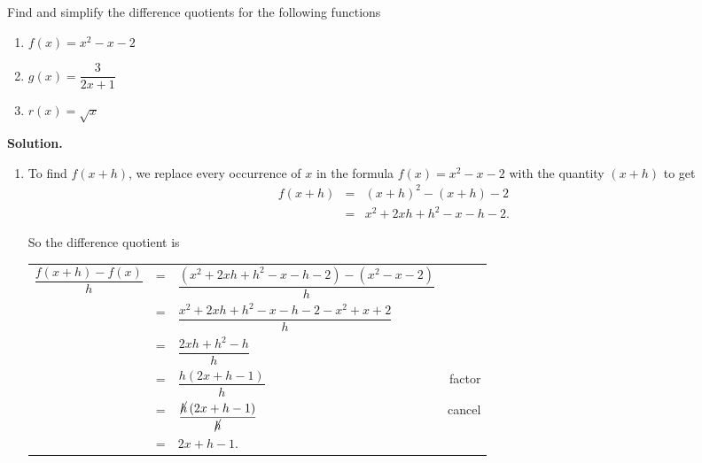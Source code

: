 \begin{ex}  \label{differencequotientex} Find and simplify the difference quotients for the following functions

\begin{multicols}{3}

\begin{enumerate}

\item  $f(x) = x^2-x-2$ 

\item  $g(x) = \dfrac{3}{2x+1}$

\item  $r(x) = \sqrt{x}$ 

\end{enumerate}

\end{multicols}

{\bf Solution.}
 
\begin{enumerate}

\item To find $f(x+h)$, we replace every occurrence of $x$ in the formula $f(x) = x^2-x-2$ with the quantity $(x+h)$ to get \[ \begin{array}{rclr}  
 
 f(x+h) & = & (x+h)^2 - (x+h) -2 & \\ [8pt]
 & = & x^2 + 2xh + h^2 - x - h - 2.
 \end{array} \]

So the difference quotient is

\setlength{\extrarowheight}{12pt}

\begin{longtable}{rclr}  

$\dfrac{f(x+h)-f(x)}{h}$ & = & $\dfrac{\left(x^2+2xh+h^2-x-h-2 \right)-\left(x^{2}-x-2 \right)}{h}$ & \\[8pt] 
& = & $\dfrac{x^2+2xh+h^2-x-h-2-x^2+x+2}{h}$ & \\ [8pt]
& = & $\dfrac{2xh+h^2-h}{h}$ & \\ [8pt]
& = & $\dfrac{h \left(2x+h-1\right)}{h}$ & factor \\ [8pt]
& = & $\dfrac{\cancel{h} \left(2x+h-1\right)}{\cancel{h}}$ & cancel \\ [8pt]
& = & $2x+h-1$. \\

\end{longtable} 


\end{enumerate}
\end{ex}
